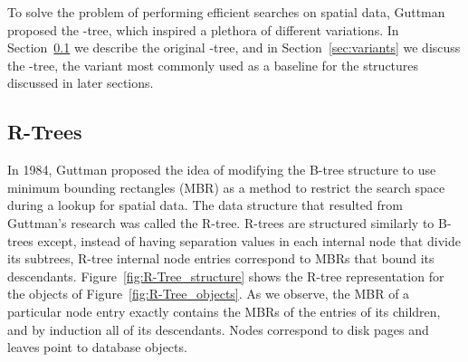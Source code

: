 To solve the problem of performing efficient searches on spatial data, 
Guttman proposed the \rbase-tree, which inspired a plethora of different 
variations. In Section~\ref{sec:rtrees} we describe the original \rbase-tree, 
and in Section~\ref{sec:variants} we discuss the \rstar-tree, the variant most 
commonly used as a baseline for the structures discussed in later sections.

\subsection{R-Trees}
\label{sec:rtrees}
In 1984, Guttman proposed the idea of modifying the B-tree structure to
use minimum bounding rectangles (MBR) as a method to restrict the search space
during a lookup for spatial data\cite{guttman84}. The data structure that 
resulted from Guttman's research was called the R-tree. R-trees are structured
similarly to B-trees except, instead of having separation values in each 
internal node that divide its subtrees, R-tree internal node entries 
correspond to MBRs that bound its descendants. 
Figure~\ref{fig:R-Tree_structure} shows the R-tree representation for the 
objects of Figure~\ref{fig:R-Tree_objects}. As we observe, the MBR of a 
particular node entry exactly contains the MBRs of the entries of its children,
and by induction all of its descendants.
Nodes correspond to disk pages and leaves point to 
database objects.

